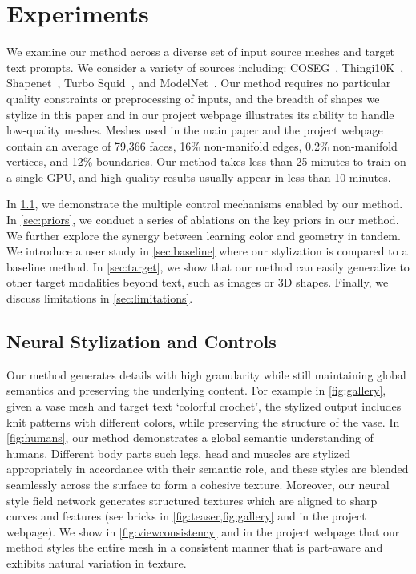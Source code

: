 \section{Experiments}
\label{sec:experiments}
We examine our method across a diverse set of input source meshes and target text prompts. We consider a variety of sources including: COSEG~\cite{coseg}, Thingi10K~\cite{Thingi10K}, Shapenet~\cite{chang2015shapenet}, Turbo Squid~\cite{turbosquid}, and ModelNet~\cite{modelnet}. Our method requires no particular quality constraints or preprocessing of inputs, and the breadth of shapes we stylize in this paper and in our project webpage  illustrates its ability to handle low-quality meshes. Meshes used in the main paper and the project webpage contain an average of 79,366 faces, 16\% non-manifold edges, 0.2\% non-manifold vertices, and 12\% boundaries. Our method takes less than 25 minutes to train on a single GPU, and high quality results usually appear in less than 10 minutes. 

In \cref{sec:control}, we demonstrate the multiple control mechanisms enabled by our method. In \cref{sec:priors}, we conduct a series of ablations on the key priors in our method.
We further explore the synergy between learning color and geometry in tandem. We introduce a user study in \cref{sec:baseline} where our stylization is compared to a baseline method. 
In \cref{sec:target}, we show that our method can easily generalize to other target modalities beyond text, such as images or 3D shapes. Finally, we discuss limitations in \cref{sec:limitations}. 

\subsection{Neural Stylization and Controls}
\label{sec:control}
Our method generates details with high granularity while still maintaining global semantics and preserving the underlying content. For example in \cref{fig:gallery}, given a vase mesh and target text `colorful crochet', the stylized output includes knit patterns with different colors, while preserving the structure of the vase. In \cref{fig:humans}, our method demonstrates a global semantic understanding of humans. Different body parts such legs, head and muscles are stylized appropriately in accordance with their semantic role, and these styles are blended seamlessly across the surface to form a cohesive texture. Moreover, our neural style field network generates structured textures which are aligned to sharp curves and features (see bricks in \cref{fig:teaser,fig:gallery} and in the project webpage). We show in \cref{fig:viewconsistency} and in the project webpage that our method styles the entire mesh in a consistent manner that is part-aware and exhibits natural variation in texture. 

